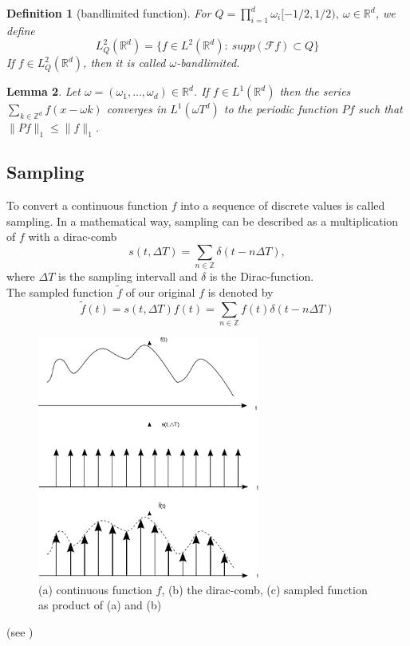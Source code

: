 \documentclass[a4paper, 11pt]{scrreprt}
\newtheorem{defi}{Definition}[section]
\newtheorem{lemma}[defi]{Lemma}
\newcommand{\RR}{\mathbb{R}}
\newcommand{\ZZ}{\mathbb{Z}}
\newcommand{\FF}{\mathcal{F}}
\begin{document}
\begin{defi}[bandlimited function]
	For \(Q = \prod_{i=1}^d \omega_i[-1/2, 1/2),\ \omega\in\RR^d\), we define
	\begin{equation}
		L_Q^2(\RR^d) = \{f\in L^2(\RR^d):\ supp(\FF f) \subset Q\}
	\end{equation}
	If \(f\in L_Q^2(\RR^d)\), then it is called \(\omega\)-bandlimited.
\end{defi}

\begin{lemma}
Let $\omega = (\omega_1,\ldots,\omega_d) \in \RR^d$. If $f \in L^1(\RR^d)$ then the series $\sum_{k \in \ZZ^d} f(x-\omega k)$ converges in $L^1(\omega T^d)$ to the periodic function $Pf$ such that $\|Pf\|_1 \leq \|f\|_1$.
\end{lemma}

\subsection{Sampling}
To convert a continuous function \(f\) into a sequence of discrete values is called sampling. In a mathematical way, sampling can be described as a multiplication of \(f\) with a dirac-comb 
\[s(t,\Delta T) = \sum_{n\in\ZZ} \delta(t-n\Delta T), \]
where \(\Delta T\) is the sampling intervall and \(\delta\) is the Dirac-function.\\
The sampled function \(\tilde{f}\) of our original \(f\) is denoted by
\begin{equation}
	\tilde{f} (t) = s(t,\Delta T) f(t) = \sum_{n\in\ZZ} f(t)\delta(t-n\Delta T)
\end{equation}
\begin{figure}[htpb]
	\centering
	\includegraphics[width=0.65\textwidth]{Sampling-Visualisierung.pdf}
	\caption{(a) continuous function \(f\), (b) the dirac-comb, (c) sampled function as product of (a) and (b)}
\end{figure}
(see \cite{marks02})
\end{document}
